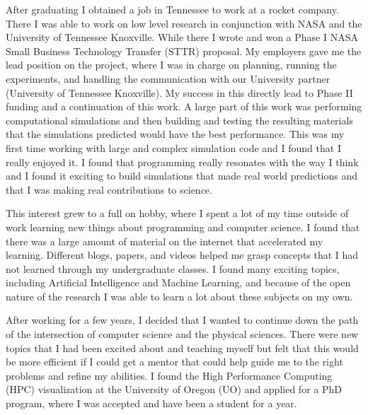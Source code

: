 \documentclass[12pt]{article}
\begin{document}
After graduating I obtained a job in Tennessee to work at a rocket company.
There I was able to work on low level research in conjunction with NASA and the
University of Tennessee Knoxville. While there I wrote and won a Phase I NASA
Small Business Technology Transfer (STTR) proposal. My employers gave me the
lead position on the project, where I was in charge on planning, running the
experiments, and handling the communication with our University partner
(University of Tennessee Knoxville).  My success in this directly lead to Phase
II funding and a continuation of this work. A large part of this work was
performing computational simulations and then building and testing the resulting
materials that the simulations predicted would have the best performance. This
was my first time working with large and complex simulation code and I found
that I really enjoyed it. I found that programming really resonates with the way
I think and I found it exciting to build simulations that made real world
predictions and that I was making real contributions to science. 

This interest grew to a full on hobby, where I spent a lot of my time outside of
work learning new things about programming and computer science. I found that
there was a large amount of material on the internet that accelerated my
learning. Different blogs, papers, and videos helped me grasp concepts that I
had not learned through my undergraduate classes. I found many exciting topics,
including Artificial Intelligence and Machine Learning, and because of the open
nature of the research I was able to learn a lot about these subjects on my own.

After working for a few years, I decided that I wanted to continue down the path
of the intersection of computer science and the physical sciences. There were
new topics that I had been excited about and teaching myself but felt that this
would be more efficient if I could get a mentor that could help guide me to the
right problems and refine my abilities. I found the High Performance Computing
(HPC) visualization at the University of Oregon (UO) and applied for a PhD
program, where I was accepted and have been a student for a year. 
\end{document}
